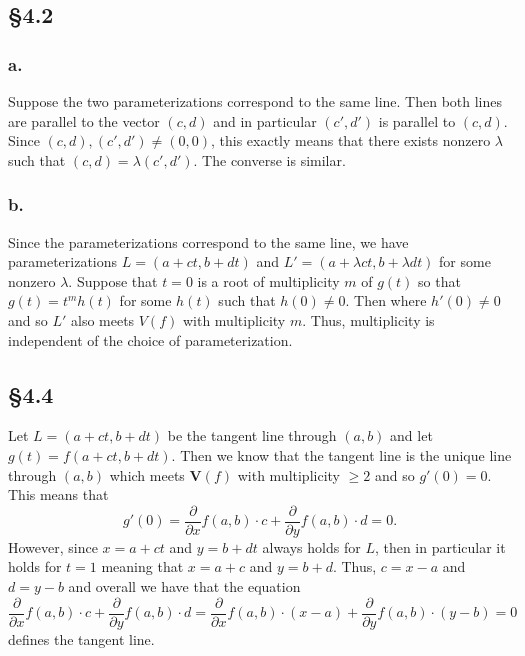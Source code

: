 \documentclass[letterpaper]{article}
\begin{document}
\subsection*{\S 4.2}

\subsubsection*{a.}

Suppose the two parameterizations correspond to the same line.
Then both lines are parallel to the vector $(c, d)$ and in particular $(c', d')$ is parallel to $(c, d)$.
Since $(c, d), (c', d') \neq (0, 0)$, this exactly means that there exists nonzero $\lambda$ such that $(c, d) = \lambda(c', d')$.
The converse is similar.

\subsubsection*{b.}

Since the parameterizations correspond to the same line, we have parameterizations $L = (a + ct, b + dt)$ and $L' = (a + \lambda ct, b + \lambda dt)$ for some nonzero $\lambda$.
Suppose that $t = 0$ is a root of multiplicity $m$ of $g(t)$ so that $g(t) = t^{m}h(t)$ for some $h(t)$ such that $h(0) \neq 0$.
Then  where $h'(0) \neq 0$ and so $L'$ also meets $V(f)$ with multiplicity $m$.
Thus, multiplicity is independent of the choice of parameterization.

\clearpage

\subsection*{\S 4.4}

Let $L = (a + ct, b + dt)$ be the tangent line through $(a, b)$ and let $g(t) = f(a + ct, b + dt)$.
Then we know that the tangent line is the unique line through $(a, b)$ which meets $\mathbf{V}(f)$ with multiplicity $\geq 2$ and so $g'(0) = 0$.
This means that
\[
 g'(0) = \frac{\partial}{\partial x}f(a, b) \cdot c + \frac{\partial}{\partial y}f(a, b) \cdot d = 0.
\]
However, since $x = a + ct$ and $y = b + dt$ always holds for $L$, then in particular it holds for $t = 1$ meaning that $x = a + c$ and $y = b + d$.
Thus, $c = x - a$ and $d = y - b$ and overall we have that the equation
\[
  \frac{\partial}{\partial x}f(a, b) \cdot c + \frac{\partial}{\partial y}f(a, b) \cdot d = \frac{\partial}{\partial x}f(a, b) \cdot (x - a) + \frac{\partial}{\partial y}f(a, b) \cdot (y - b) = 0
\]
defines the tangent line.
\end{document}
